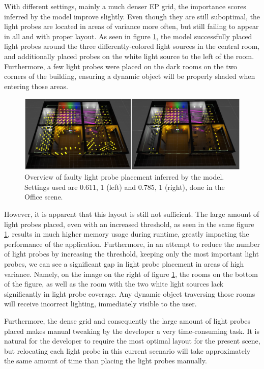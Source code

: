With different settings, mainly a much denser EP grid, the importance scores inferred by the model improve slightly. Even though they are still suboptimal, the light probes are located in areas of variance more often, but still failing to appear in all and with proper layout. As seen in figure \ref{fig:office_faulty_new}, the model successfully placed light probes around the three differently-colored light sources in the central room, and additionally placed probes on the white light source to the left of the room. Furthermore, a few light probes were placed on the dark rooms on the two corners of the building, ensuring a dynamic object will be properly shaded when entering those areas.

\begin{figure}[h]
	\centering
	\includegraphics[width=\linewidth]{Graphics/results/concats/comparison9.png}
	\caption{Overview of faulty light probe placement inferred by the model. Settings used are 0.611, 1 (left) and 0.785, 1 (right), done in the Office scene.}
	\label{fig:office_faulty_new}
\end{figure}

However, it is apparent that this layout is still not sufficient. The large amount of light probes placed, even with an increased threshold, as seen in the same figure \ref{fig:office_faulty_new}, results in much higher memory usage during runtime, greatly impacting the performance of the application. Furthermore, in an attempt to reduce the number of light probes by increasing the threshold, keeping only the most important light probes, we can see a significant gap in light probe placement in areas of high variance. Namely, on the image on the right of figure \ref{fig:office_faulty_new}, the rooms on the bottom of the figure, as well as the room with the two white light sources lack significantly in light probe coverage. Any dynamic object traversing those rooms will receive incorrect lighting, immediately visible to the user. 

Furthermore, the dense grid and consequently the large amount of light probes placed makes manual tweaking by the developer a very time-consuming task. It is natural for the developer to require the most optimal layout for the present scene, but relocating each light probe in this current scenario will take approximately the same amount of time than placing the light probes manually.\newline


